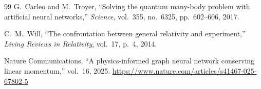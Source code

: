 \documentclass[11pt,a4paper]{article}
\begin{document}
\begin{thebibliography}{99}
G.~Carleo and M.~Troyer,
``Solving the quantum many-body problem with artificial neural networks,''
\textit{Science}, vol.~355, no.~6325, pp.~602--606, 2017.

C.~M.~Will,
``The confrontation between general relativity and experiment,''
\textit{Living Reviews in Relativity}, vol.~17, p.~4, 2014.

Nature Communications,
``A physics-informed graph neural network conserving linear momentum,''
vol.~16, 2025. \url{https://www.nature.com/articles/s41467-025-67802-5}

\end{thebibliography}
\end{document}
